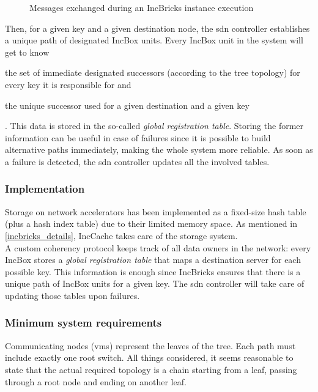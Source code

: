 \begin{figure}[!htb]
    \centering
    \usebox{\incbrickssd}
    \caption{Messages exchanged during an IncBricks \texorpdfstring{\cite{incbricks}}{} instance execution}
\end{figure}

Then, for a given key and a given destination node, the \gls{sdn} controller establishes a unique path of designated IncBox units.
Every IncBox unit in the system will get to know
\begin{mylist}
    \item the set of immediate designated successors (according to the tree topology) for every key it is responsible for and
    \item the unique successor used for a given destination and a given key
\end{mylist}.
This data is stored in the so-called \textit{global registration table}.
Storing the former information can be useful in case of failures since it is possible to build alternative paths immediately, making the whole system more reliable.
As soon as a failure is detected, the \gls{sdn} controller updates all the involved tables.

\subsubsection{Implementation}
Storage on network accelerators has been implemented as a fixed-size hash table (plus a hash index table) due to their limited memory space.
As mentioned in \autoref{incbricks_details}, IncCache takes care of the storage system.\\
A custom coherency protocol keeps track of all data owners in the network: every IncBox stores a \textit{global registration table} that maps a destination server for each possible key.
This information is enough since IncBricks \cite{incbricks} ensures that there is a unique path of IncBox units for a given key.
The \gls{sdn} controller will take care of updating those tables upon failures.

\subsubsection{Minimum system requirements}
Communicating nodes (\glspl{vm}) represent the leaves of the tree.
Each path must include exactly one root switch.
All things considered, it seems reasonable to state that the actual required topology is a chain starting from a leaf, passing through a root node and ending on another leaf.

